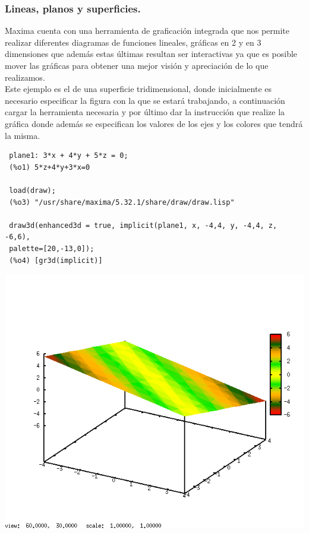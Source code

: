 \documentclass[12pt]{article}
\begin{document}
\subsubsection*{Lineas, planos y superficies.}
 Maxima cuenta con una herramienta de graficación integrada que nos permite realizar diferentes diagramas de funciones lineales, gráficas en 2 y en 3 dimensiones que además estas últimas resultan ser interactivas ya que es posible mover las gráficas para obtener una mejor visión y apreciación de lo que realizamos.\\

 Este ejemplo es el de una superficie tridimensional, donde inicialmente es necesario especificar la figura con la que se estará trabajando, a continuación cargar la herramienta necesaria y por último dar la instrucción que realize la gráfica donde además se especifican los valores de los ejes y los colores que tendrá la misma.\\

\begin{verbatim}
 plane1: 3*x + 4*y + 5*z = 0;
 (%o1) 5*z+4*y+3*x=0

 load(draw);
 (%o3) "/usr/share/maxima/5.32.1/share/draw/draw.lisp"

 draw3d(enhanced3d = true, implicit(plane1, x, -4,4, y, -4,4, z, -6,6),
 palette=[20,-13,0]);
 (%o4) [gr3d(implicit)]
 \end{verbatim}

 \includegraphics[scale=0.4]{actividad80.png}
\end{document}
